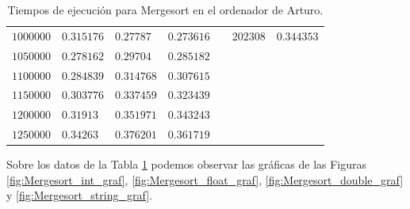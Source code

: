 \documentclass[12pt]{article}
\begin{document}
\begin{table}
\begin{tabular}{|l|l|l|l||l||l|l|}
            $1000000$ & $0.315176$& $0.27787$& $0.273616$&&$202308$ & $0.344353$ \\
            $1050000$ & $0.278162$& $0.29704$& $0.285182$ & & & \\
            $1100000$ & $0.284839$& $0.314768$& $0.307615$ & & & \\
            $1150000$ & $0.303776$& $0.337459$& $0.323439$ & & & \\
            $1200000$ & $0.31913$& $0.351971$& $0.343243$ & & & \\
            $1250000$ & $0.34263$& $0.376201$& $0.361719$ & & & \\
             \hline
        \end{tabular}
        \caption{Tiempos de ejecución para Mergesort en el ordenador de Arturo.}
        \label{tab:Mergesort_tiempos}
    \end{table}

    Sobre los datos de la Tabla \ref{tab:Mergesort_tiempos} podemos observar las gráficas de las Figuras \ref{fig:Mergesort_int_graf}, \ref{fig:Mergesort_float_graf}, \ref{fig:Mergesort_double_graf} y \ref{fig:Mergesort_string_graf}.
\end{document}
